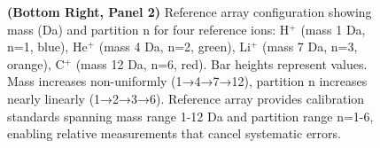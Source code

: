 \begin{figure}[htbp]
{    \textbf{(Bottom Right, Panel 2)} Reference array configuration showing mass (Da) and partition n for four reference ions: H$^+$ (mass 1 Da, n=1, blue), He$^+$ (mass 4 Da, n=2, green), Li$^+$ (mass 7 Da, n=3, orange), C$^+$ (mass 12 Da, n=6, red). Bar heights represent values. Mass increases non-uniformly (1→4→7→12), partition n increases nearly linearly (1→2→3→6). Reference array provides calibration standards spanning mass range 1-12 Da and partition range n=1-6, enabling relative measurements that cancel systematic errors.}
    \label{fig:synthesizer_validation}
\end{figure}
